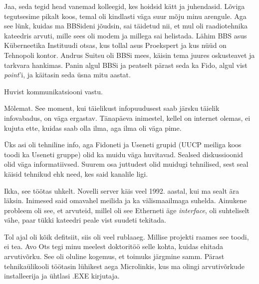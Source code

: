 
Jaa, seda tegid head vanemad kolleegid, kes hoidsid kätt ja 
juhendasid. Lõviga tegutsesime pikalt koos, temal oli kindlasti 
väga suur mõju minu arengule. Aga see lünk, kuidas ma BBSideni 
jõudsin, sai täidetud nii, et mul oli raadiotehnika kateedris 
arvuti, mille sees oli modem ja millega sai helistada. Lähim BBS
asus Küberneetika Instituudi otsas, kus tollal asus 
Proekspert ja kus nüüd on Tehnopoli kontor. Andrus Suitsu 
oli BBSi mees, käisin tema juures oskusteavet ja tarkvara 
hankimas. Panin algul BBSi ja peatselt pärast seda ka Fido, algul vist
\emph{point}'i, ja käitasin seda üsna mitu aastat. 


Huvist kommunikatsiooni vastu.


Mõlemat. See moment, kui täielikust infopuudusest saab järsku täielik 
infovabadus, on väga ergastav. Tänapäeva inimestel, kellel on internet olemas, ei 
kujuta ette, kuidas saab olla ilma, aga ilma oli väga pime.

Üks asi oli tehniline info, aga Fidoneti ja Useneti grupid
(UUCP meiliga koos toodi ka Useneti gruppe) olid ka muidu väga 
huvitavad. Sealsed diskussioonid olid väga 
informatiivsed. Suurem osa 
juttudest olid muidugi tehnilised, sest seal käisid tehnikud ehk need, kes 
said kanalile ligi.


Ikka, see töötas uhkelt. Novelli server käis veel 1992. aastal, kui ma 
sealt ära läksin. Inimesed said omavahel meilida ja ka välismaailmaga 
suhelda. Ainukene probleem oli see, et arvuteid, millel oli see 
Etherneti äge \emph{interface}, oli suhteliselt vähe, paar tükki kateedri 
peale vist suudeti tekitada.


Tol ajal oli kõik defitsiit, siis oli veel rublaaeg. Millise projekti 
raames see toodi, ei tea. Avo Ots tegi minu meelest 
doktoritöö selle kohta, kuidas ehitada arvutivõrku. See oli 
oluline kogemus, et toimuks järgmine samm. Pärast tehnikaülikooli 
töötasin lühikest aega Microlinkis, kus ma olingi 
arvutivõrkude installeerija ja ühtlasi .EXE kirjutaja.

